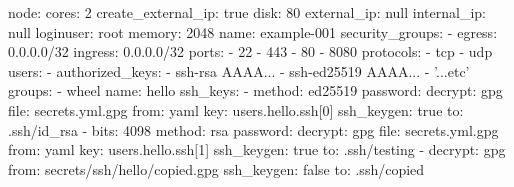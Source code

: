 
node:
  cores: 2
  create_external_ip: true
  disk: 80
  external_ip: null
  internal_ip: null
  loginuser: root
  memory: 2048
  name: example-001
  security_groups:
  - egress: 0.0.0.0/32
    ingress: 0.0.0.0/32
    ports:
    - 22
    - 443
    - 80
    - 8080
    protocols:
    - tcp
    - udp
  users:
  - authorized_keys:
    - ssh-rsa AAAA...
    - ssh-ed25519 AAAA...
    - '...etc'
    groups:
    - wheel
    name: hello
    ssh_keys:
    - method: ed25519
      password:
        decrypt: gpg
        file: secrets.yml.gpg
        from: yaml
        key: users.hello.ssh[0]
      ssh_keygen: true
      to: .ssh/id_rsa
    - bits: 4098
      method: rsa
      password:
        decrypt: gpg
        file: secrets.yml.gpg
        from: yaml
        key: users.hello.ssh[1]
      ssh_keygen: true
      to: .ssh/testing
    - decrypt: gpg
      from: secrets/ssh/hello/copied.gpg
      ssh_keygen: false
      to: .ssh/copied
